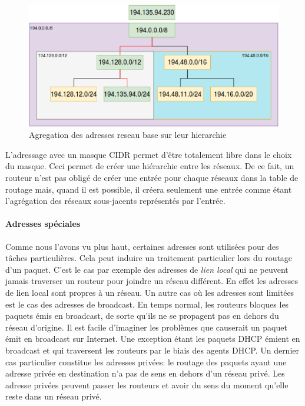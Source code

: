 \begin{figure}[h]
\centering
\includegraphics[width=15cm]{./pics/routagecidr.eps}
\caption{Agregation des adresses reseau base sur leur hierarchie}
\label{fig:routcidr}
\end{figure}

L'adressage avec un masque CIDR permet d'être totalement libre dans le choix du
masque. Ceci permet de créer une hiérarchie entre les réseaux. De ce fait,
un routeur n'est pas obligé de créer une entrée pour chaque réseaux dans la
table de routage mais, quand il est possible, il créera seulement une entrée
comme étant l'agrégation des réseaux sous-jacents représentés par l'entrée.



\paragraph{Adresses spéciales}


Comme nous l'avons vu plus haut, certaines adresses sont utilisées pour des
tâches particulières. Cela peut induire un traitement particulier lors du routage
d'un paquet.  C'est le cas par exemple des adresses de {\it lien local} qui ne
peuvent jamais traverser un routeur pour joindre un réseau différent. En effet
les adresses de lien local sont propres à un réseau.
Un autre cas où les adresses sont limitées est le cas des adresses de broadcast.
En temps normal, les routeurs bloques les paquets émis en broadcast, de sorte qu'ils ne se propagent pas en dehors du réseau d'origine. Il est facile d'imaginer les problèmes que causerait un paquet émit en broadcast sur Internet. Une exception étant les paquets DHCP émient en broadcast et qui traversent les routeurs par le biais des agents DHCP.
Un dernier cas particulier constitue les adresses privées: le routage des paquets ayant une adresse privée en destination n'a pas de sens en dehors d'un réseau privé. Les adresse privées peuvent passer les routeurs et avoir du sens du moment qu'elle reste dans un réseau privé.

